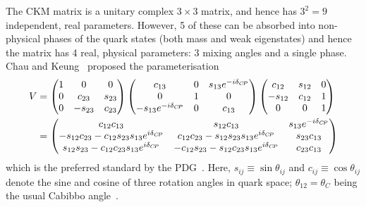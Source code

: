 The CKM matrix is a unitary complex $3\times3$ matrix, and hence has $3^2=9$ independent, real parameters. However, 5 of these can be absorbed into non-physical phases of the quark states (both mass and weak eigenstates) and hence the matrix has 4 real, physical parameters: 3 mixing angles and a single phase. Chau and Keung~\cite{chauCommentsParametrizationKobayashiMaskawa1984} proposed the parameterisation
\begin{align}
\begin{split}\label{eq:CK_CKM_matrix}
        V &= 
        \begin{pmatrix}
            1 & 0 & 0 \\ 0 & c_{23} & s_{23} \\ 0 & -s_{23} & c_{23}
        \end{pmatrix}
        \begin{pmatrix}
            c_{13} & 0 & s_{13}e^{-i\delta_{{C\!P}}} \\ 0 & 1 & 0 \\ -s_{13}e^{-i\delta_{{C\!P}}} & 0 & c_{13}
        \end{pmatrix}
        \begin{pmatrix}
            c_{12} & s_{12}  & 0 \\ -s_{12} & c_{12} & 1 \\ 0 & 0 & 1
        \end{pmatrix}
        \\
        &=
        \begin{pmatrix}
            c_{12}c_{13} & s_{12}c_{13} & s_{13}e^{-i\delta_{{C\!P}}} \\
            -s_{12}c_{23}-c_{12}s_{23}s_{13}e^{i\delta_{{C\!P}}} &
            c_{12}c_{23}-s_{12}s_{23}s_{13}e^{i\delta_{{C\!P}}} &
            s_{23}c_{13} \\
            s_{12}s_{23}-c_{12}c_{23}s_{13}e^{i\delta_{{C\!P}}} &
            -c_{12}s_{23}-s_{12}c_{23}s_{13}e^{i\delta_{{C\!P}}} &
            c_{23}c_{13} \\
        \end{pmatrix}
\end{split}
\end{align}
which is the preferred standard by the PDG~\cite{PDG2020}. Here, $s_{ij}\equiv\sin \theta_{ij}$ and $c_{ij}\equiv\cos \theta_{ij}$ denote the sine and cosine of three rotation angles in quark space; $\theta_{12}=\theta_C$ being the usual Cabibbo angle~\cite{cabibboUnitarySymmetryLeptonic1963}.

